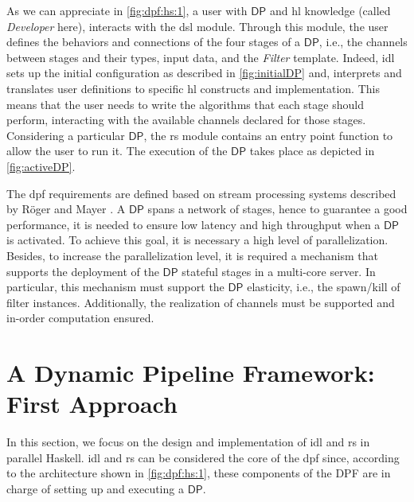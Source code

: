\documentclass[preprint]{elsarticle}
\newcommand{\DP}{\mathsf{DP}}
\begin{document}
As we can appreciate in \autoref{fig:dpf:hs:1}, a user with $\DP$ and \acrshort{hl} knowledge (called \textit{Developer} here), interacts with the \acrshort{dsl} module. Through this module, the user defines the behaviors and connections of the four stages of a $\DP$, i.e., the channels between stages and their types, input data, and the \textit{Filter} template.  Indeed, \acrshort{idl} sets up the initial configuration as described in \autoref{fig:initialDP} and,   interprets and translates user definitions to specific \acrshort{hl} constructs and implementation. This means that the user needs to write the algorithms that each stage should perform,  interacting with the available channels declared for those stages. Considering a particular $\DP$, the \acrshort{rs} module contains an entry point function to allow the user to run it. The execution of the $\DP$ takes place as depicted in \autoref{fig:activeDP}.

The \acrshort{dpf} requirements are defined based on stream processing systems described by R\"oger and Mayer \cite{HR19}. A $\DP$ spans a network of stages, hence to guarantee a good performance, it is needed to ensure low latency and high throughput when a $\DP$ is activated. To achieve this goal, it is necessary a high level of parallelization. Besides, to increase the parallelization level, it is required a mechanism that supports the deployment of the $\DP$ stateful stages in a multi-core server. In particular, this mechanism must support the $\DP$ elasticity, i.e., the spawn/kill  of filter instances. Additionally, the realization of channels must be supported and in-order computation ensured. 

%
\section{A Dynamic Pipeline Framework: First Approach}\label{section:prob:dp:haskell}

In this section, we focus on the design and implementation of \acrshort{idl} and \acrshort{rs} in parallel Haskell. \acrshort{idl} and \acrshort{rs} can be considered the core of the \acrshort{dpf} since, according to the architecture shown in \autoref{fig:dpf:hs:1}, these components of the DPF are in charge of setting up and executing a $\DP$. 
\end{document}
